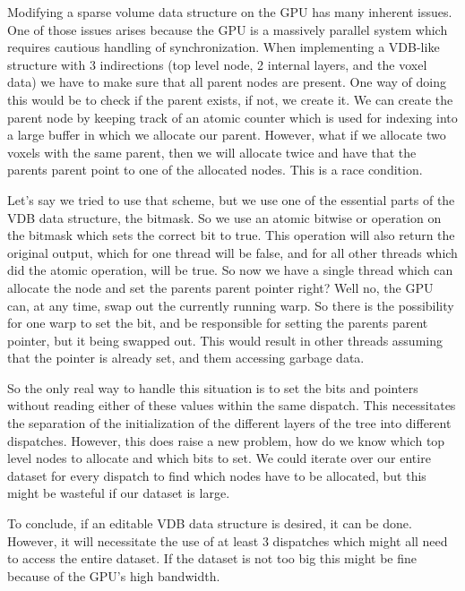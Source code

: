 Modifying a sparse volume data structure on the GPU has many inherent issues. One of those issues arises because the GPU is a massively parallel system which requires cautious handling of synchronization. When implementing a VDB-like structure with 3 indirections (top level node, 2 internal layers, and the voxel data) we have to make sure that all parent nodes are present. One way of doing this would be to check if the parent exists, if not, we create it. We can create the parent node by keeping track of an atomic counter which is used for indexing into a large buffer in which we allocate our parent. However, what if we allocate two voxels with the same parent, then we will allocate twice and have that the parents parent point to one of the allocated nodes. This is a race condition.

Let's say we tried to use that scheme, but we use one of the essential parts of the VDB data structure, the bitmask. So we use an atomic bitwise or operation on the bitmask which sets the correct bit to true. This operation will also return the original output, which for one thread will be false, and for all other threads which did the atomic operation, will be true. So now we have a single thread which can allocate the node and set the parents parent pointer right? Well no, the GPU can, at any time, swap out the currently running warp. So there is the possibility for one warp to set the bit, and be responsible for setting the parents parent pointer, but it being swapped out. This would result in other threads assuming that the pointer is already set, and them accessing garbage data.

So the only real way to handle this situation is to set the bits and pointers without reading either of these values within the same dispatch. This necessitates the separation of the initialization of the different layers of the tree into different dispatches. However, this does raise a new problem, how do we know which top level nodes to allocate and which bits to set. We could iterate over our entire dataset for every dispatch to find which nodes have to be allocated, but this might be wasteful if our dataset is large.

To conclude, if an editable VDB data structure is desired, it can be done. However, it will necessitate the use of at least 3 dispatches which might all need to access the entire dataset. If the dataset is not too big this might be fine because of the GPU's high bandwidth.

